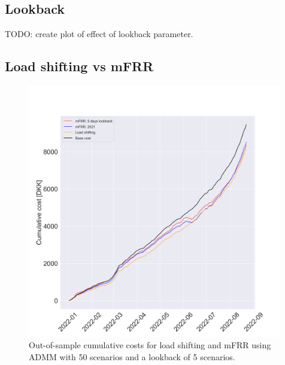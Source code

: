 \documentclass[11pt,a4paper]{article}
\begin{document}
\subsection{Lookback}

TODO: create plot of effect of lookback parameter.

\subsection{Load shifting vs mFRR}

\begin{figure}[H]
    \centering
    \includegraphics[width=0.99\textwidth]{figures/cumulative_cost_comparison.png}
    \caption{Out-of-sample cumulative costs for load shifting and mFRR using ADMM with 50 scenarios and a lookback of 5 scenarios.}
    \label{fig:cumulative_cost_comparison}
\end{figure}
\end{document}

